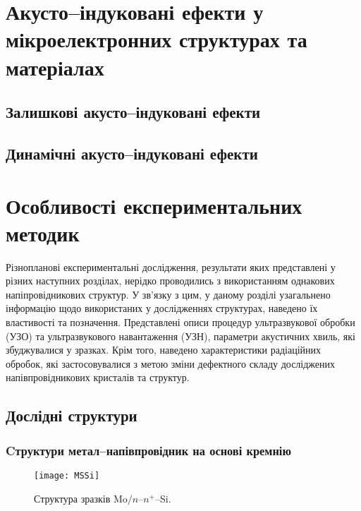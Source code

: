 \documentclass[a4paper,14pt,oneside,openany]{memoir}
\begin{document}


\chapter{Акусто--індуковані ефекти у мікроелектронних структурах та матеріалах\label{Ozlyad}}
\section{Залишкові акусто--індуковані ефекти}
\section{Динамічні акусто--індуковані ефекти}


\chapter{Особливості експериментальних методик\label{Exper}}
Різнопланові експериментальні дослідження, результати яких представлені у різних наступних розділах, нерідко проводились з використанням однакових напіпровідникових структур.
У зв'язку з цим, у даному розділі узагальнено інформацію щодо використаних у дослідженнях структурах, наведено їх властивості та позначення.
Представлені описи процедур ультразвукової обробки (УЗО) та ультразвукового навантаження (УЗН),
параметри акустичних хвиль, які збуджувалися у зразках.
Крім того, наведено характеристики радіаційних обробок, які застосовувалися з метою зміни дефектного складу досліджених напівпровідникових кристалів та структур.
\section{Дослідні структури}
\subsection{Cтруктури метал--напівпровідник на основі кремнію\label{MSSi}}

\begin{figure}[b]
\center
\texttt{[image: MSSi]}%
\caption{\label{figMSSi}
Структура зразків Mo$/n$--$n^+$--Si.
}
\end{figure}
\end{document}
